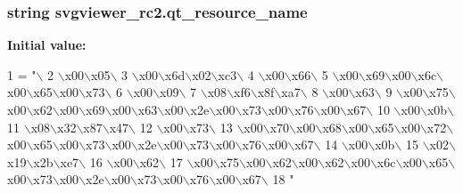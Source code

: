 \subsubsection[{qt\+\_\+resource\+\_\+name}]{\setlength{\rightskip}{0pt plus 5cm}string svgviewer\+\_\+rc2.\+qt\+\_\+resource\+\_\+name}\label{namespacesvgviewer__rc2_ac317eff25f3faf95ab883c871e899bd1}
{\bfseries Initial value\+:}
\begin{DoxyCode}
1 = \textcolor{stringliteral}{"\(\backslash\)}
2 \textcolor{stringliteral}{\(\backslash\)x00\(\backslash\)x05\(\backslash\)}
3 \textcolor{stringliteral}{\(\backslash\)x00\(\backslash\)x6d\(\backslash\)x02\(\backslash\)xc3\(\backslash\)}
4 \textcolor{stringliteral}{\(\backslash\)x00\(\backslash\)x66\(\backslash\)}
5 \textcolor{stringliteral}{\(\backslash\)x00\(\backslash\)x69\(\backslash\)x00\(\backslash\)x6c\(\backslash\)x00\(\backslash\)x65\(\backslash\)x00\(\backslash\)x73\(\backslash\)}
6 \textcolor{stringliteral}{\(\backslash\)x00\(\backslash\)x09\(\backslash\)}
7 \textcolor{stringliteral}{\(\backslash\)x08\(\backslash\)xf6\(\backslash\)x8f\(\backslash\)xa7\(\backslash\)}
8 \textcolor{stringliteral}{\(\backslash\)x00\(\backslash\)x63\(\backslash\)}
9 \textcolor{stringliteral}{\(\backslash\)x00\(\backslash\)x75\(\backslash\)x00\(\backslash\)x62\(\backslash\)x00\(\backslash\)x69\(\backslash\)x00\(\backslash\)x63\(\backslash\)x00\(\backslash\)x2e\(\backslash\)x00\(\backslash\)x73\(\backslash\)x00\(\backslash\)x76\(\backslash\)x00\(\backslash\)x67\(\backslash\)}
10 \textcolor{stringliteral}{\(\backslash\)x00\(\backslash\)x0b\(\backslash\)}
11 \textcolor{stringliteral}{\(\backslash\)x08\(\backslash\)x32\(\backslash\)x87\(\backslash\)x47\(\backslash\)}
12 \textcolor{stringliteral}{\(\backslash\)x00\(\backslash\)x73\(\backslash\)}
13 \textcolor{stringliteral}{\(\backslash\)x00\(\backslash\)x70\(\backslash\)x00\(\backslash\)x68\(\backslash\)x00\(\backslash\)x65\(\backslash\)x00\(\backslash\)x72\(\backslash\)x00\(\backslash\)x65\(\backslash\)x00\(\backslash\)x73\(\backslash\)x00\(\backslash\)x2e\(\backslash\)x00\(\backslash\)x73\(\backslash\)x00\(\backslash\)x76\(\backslash\)x00\(\backslash\)x67\(\backslash\)}
14 \textcolor{stringliteral}{\(\backslash\)x00\(\backslash\)x0b\(\backslash\)}
15 \textcolor{stringliteral}{\(\backslash\)x02\(\backslash\)x19\(\backslash\)x2b\(\backslash\)xe7\(\backslash\)}
16 \textcolor{stringliteral}{\(\backslash\)x00\(\backslash\)x62\(\backslash\)}
17 \textcolor{stringliteral}{\(\backslash\)x00\(\backslash\)x75\(\backslash\)x00\(\backslash\)x62\(\backslash\)x00\(\backslash\)x62\(\backslash\)x00\(\backslash\)x6c\(\backslash\)x00\(\backslash\)x65\(\backslash\)x00\(\backslash\)x73\(\backslash\)x00\(\backslash\)x2e\(\backslash\)x00\(\backslash\)x73\(\backslash\)x00\(\backslash\)x76\(\backslash\)x00\(\backslash\)x67\(\backslash\)}
18 \textcolor{stringliteral}{"}
\end{DoxyCode}
\hypertarget{namespacesvgviewer__rc2_a76272cb3c93a90dc567d1bfcd045605f}{}
